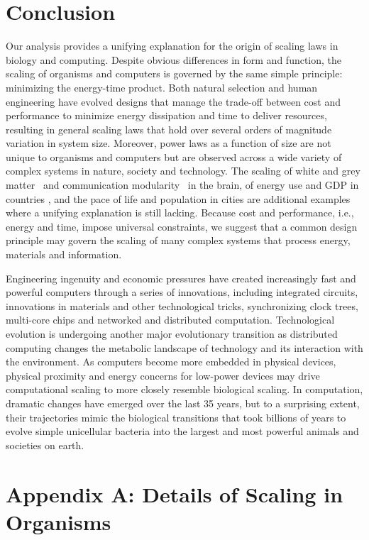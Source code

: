 \documentclass[12pt]{article}
\begin{document}
\section{Conclusion}

Our analysis provides a unifying explanation for the origin of scaling laws in
biology and computing. Despite obvious differences in form and function, the
scaling of organisms and computers is governed by the same simple principle: minimizing the energy-time product. Both natural selection and human engineering have evolved designs that manage the trade-off between cost and performance to minimize energy dissipation and time to deliver resources, resulting in general scaling laws that hold over several orders of magnitude variation in system size. Moreover, power laws as a function of size are not
unique to organisms and computers but are observed across a wide
variety of complex systems in nature, society and technology.  The scaling of
white and grey matter~\cite{zhang00} and communication modularity~\cite{meunier2010modular} in the brain, of energy use and GDP in
countries \cite{brown11}, and the pace of life and population in cities
\cite{bettencourt07} are additional examples where a unifying explanation is
still lacking.  Because cost and performance, i.e., energy and time, impose
universal constraints, we suggest that a common design principle may govern the
scaling of many complex systems that process energy, materials and information.

Engineering ingenuity and economic pressures have created increasingly
fast and powerful computers through a series of innovations, including
integrated circuits, innovations in materials and other technological
tricks, synchronizing clock trees, multi-core chips and networked and
distributed computation. Technological evolution is undergoing another
major evolutionary transition as distributed computing changes the
metabolic landscape of technology and its interaction with the
environment. As computers become more embedded in physical devices,
physical proximity and energy concerns for low-power devices may drive
computational scaling to more closely resemble biological scaling. In
computation, dramatic changes have emerged over the last 35 years, but
to a surprising extent, their trajectories mimic the biological
transitions that took billions of years to evolve simple unicellular
bacteria into the largest and most powerful animals and societies on
earth.




\section{Appendix A: Details of Scaling in Organisms}
\label{sec:AppendixOrg}
\end{document}
